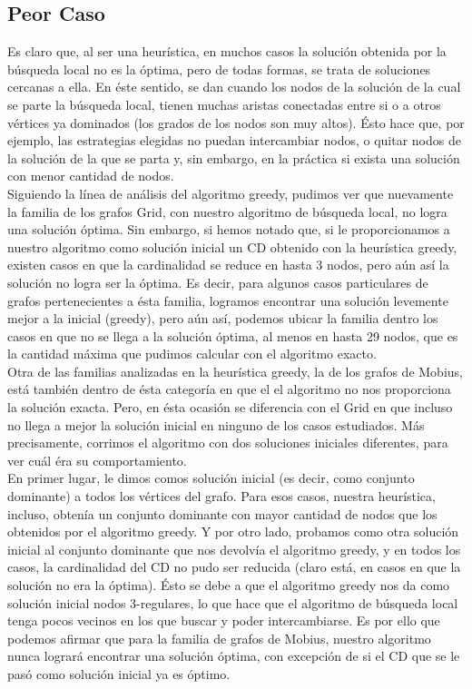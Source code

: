  \subsection{Peor Caso}
 Es claro que, al ser una heurística, en muchos casos la solución obtenida por la búsqueda local no es la óptima, pero de todas formas, se trata de soluciones cercanas a ella. En éste sentido, se dan cuando los nodos de la solución de la cual se parte la búsqueda local, tienen muchas aristas conectadas entre si o a otros vértices ya dominados (los grados de los nodos son muy altos). Ésto hace que, por ejemplo, las estrategias elegidas no puedan intercambiar nodos, o quitar nodos de la solución de la que se parta y, sin embargo, en la práctica si exista una solución con menor cantidad de nodos. \\
Siguiendo la línea de análisis del algoritmo greedy, pudimos ver que nuevamente la familia de los grafos Grid, con nuestro algoritmo de búsqueda local, no logra una solución óptima. Sin embargo, si hemos notado que, si le proporcionamos a nuestro algoritmo como solución inicial un CD obtenido con la heurística greedy, existen casos en que la cardinalidad se reduce en hasta 3 nodos, pero aún así la solución no logra ser la óptima. Es decir, para algunos casos particulares de grafos pertenecientes a ésta familia, logramos encontrar una solución levemente mejor a la inicial (greedy), pero aún así, podemos ubicar la familia dentro los casos en que no se llega a la solución óptima, al menos en hasta 29 nodos, que es la cantidad máxima que pudimos calcular con el algoritmo exacto. \\
Otra de las familias analizadas en la heurística greedy, la de los grafos de Mobius, está también dentro de ésta categoría en que el el algoritmo no nos proporciona la solución exacta. Pero, en ésta ocasión se diferencia con el Grid en que incluso no llega a mejor la solución inicial en ninguno de los casos estudiados. Más precisamente, corrimos el algoritmo con dos soluciones iniciales diferentes, para ver cuál éra su comportamiento. \\
En primer lugar, le dimos comos solución inicial (es decir, como conjunto dominante) a todos los vértices del grafo. Para esos casos, nuestra heurística, incluso, obtenía un conjunto dominante con mayor cantidad de nodos que los obtenidos por el algoritmo greedy. Y por otro lado, probamos como otra solución inicial al conjunto dominante que nos devolvía el algoritmo greedy, y en todos los casos, la cardinalidad del CD no pudo ser reducida (claro está, en casos en que la solución no era la óptima). Ésto se debe a que el algoritmo greedy nos da como solución inicial nodos 3-regulares, lo que hace que el algoritmo de búsqueda local tenga pocos vecinos en los que buscar y poder intercambiarse. Es por ello que podemos afirmar que para la familia de grafos de Mobius, nuestro algoritmo nunca logrará encontrar una solución óptima, con excepción de si el CD que se le pasó como solución inicial ya es óptimo. \\
